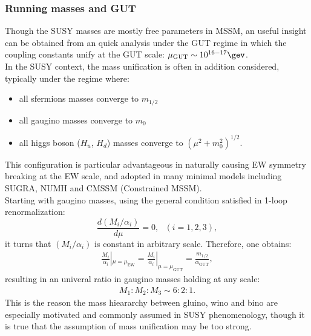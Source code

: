 \subsubsection{Running masses and GUT}
Though the SUSY masses are mostly free parameters in MSSM, 
an useful insight can be obtained from an quick analysis under the GUT regime in which the coupling constants unify at the GUT scale: $\mu_{\mathrm{GUT}}\sim 10^{16-17}\gev$. \\

In the SUSY context, the mass unification is often in addition considered, typically under the regime where:
\begin{itemize}
\item all sfermions masses converge to $m_{1/2}$
\item all gaugino masses converge to $m_0$
\item all higgs boson ($H_u$, $H_d$) masses converge to $(\mu^2+m_0^2)^{1/2}$.
\end{itemize}
This configuration is particular advantageous in naturally causing EW symmetry breaking at the EW scale, and adopted in many minimal models including SUGRA, NUMH and CMSSM (Constrained MSSM). \\

Starting with gaugino masses, using the general condition satisfied in 1-loop renormalization:
$$
\frac{d(M_i/\alpha_i)}{d\mu} = 0, \,\,\,\, (i=1,2,3),
$$
it turns that $(M_i/\alpha_i)$ is constant in arbitrary scale. Therefore, one obtains:
\begin{align}
\frac{M_i}{\alpha_i}|_{\mu=\mu_{\mathrm{EW}}}  = \frac{M_i}{\alpha_i}|_{\mu=\mu_{\mathrm{GUT}}} = \frac{m_{1/2}}{\alpha_{\mathrm{GUT}}},
\end{align}
resulting in an univeral ratio in gaugino masses holding at any scale:
\begin{align}
M_1 : M_2 : M_3 \sim 6:2:1.
\end{align}
This is the reason the mass hieararchy between gluino, wino and bino are especially motivated and commonly assumed in SUSY phenomenology, though it is true that the assumption of mass unification may be too strong. \\

